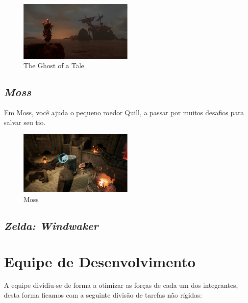 \begin{figure}[!htb] \caption{\label{tale}The Ghost of a Tale} \begin{center}
\includegraphics[width=0.5\textwidth]{imagens/tale.jpg} \end{center}
 \end{figure}

\subsection{\textit{Moss}}
Em Moss, você ajuda o pequeno roedor Quill, a passar por muitos desafios para salvar seu tio. \cite{Moss18}

\begin{figure}[!htb] \caption{\label{fig_moss}Moss} \begin{center}
\includegraphics[width=0.5\textwidth]{imagens/moss.jpg} \end{center}
 \end{figure}


\subsection{\textit{Zelda: Windwaker}}

\section{Equipe de Desenvolvimento}
A equipe dividiu-se de forma a
otimizar as forças de cada um dos integrantes, desta forma ficamos com a
seguinte divisão de tarefas não rígidas:

